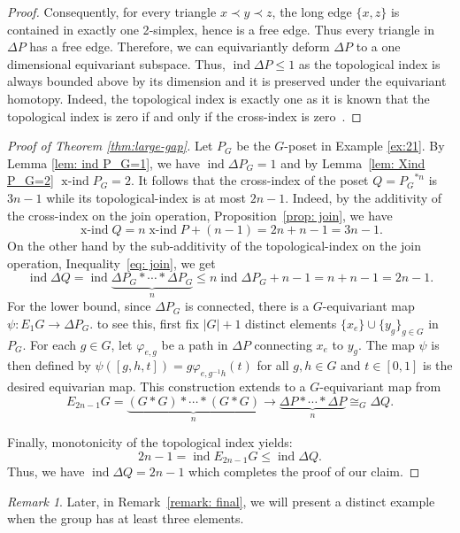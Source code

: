\documentclass[preprint,12pt]{article}
\renewcommand{\le}{\leqslant}
\theoremstyle{definition}
\theoremstyle{remark}
\newtheorem{remark}[theorem]{Remark}
\numberwithin{equation}{section}
\DeclareMathOperator{\ind}{ind}
\DeclareMathOperator{\xind}{x-ind}
\renewcommand{\phi}{\varphi}
\begin{document}
\begin{proof}
Consequently, for every triangle \(x\prec y \prec z\), the long edge \(\{x,z\}\) is contained in exactly one 2‑simplex, hence is a free edge. Thus every triangle in \(\Delta P\) has a free edge. Therefore, we can equivariantly deform $\Delta P$ to a one dimensional equivariant subspace. Thus, $\ind \Delta P\le 1$ as the topological index is always bounded above by its dimension and it is preserved under the equivariant homotopy. Indeed, the topological index is exactly one as it is known that the topological index is zero if and only if the cross-index is zero~\cite[Proposition 1]{bui2023topological}.
\end{proof}


\begin{proof}[Proof of Theorem \ref{thm:large-gap}]
Let $P_G$ be the $G$-poset in Example \ref{ex:21}. By Lemma \ref{lem: ind P_G=1}, we have $\ind \Delta P_G = 1$ and by Lemma~\ref{lem: Xind P_G=2} $\xind P_G=2$. It follows that the cross-index of the poset $Q={P_G}^{\ast n}$ is $3n-1$ while its topological-index is at most $2n-1$. Indeed, by the additivity of the cross-index on the join operation, Proposition~\ref{prop: join}, we have
$$\xind Q= n\xind P+(n-1)=2n+n-1=3n-1.$$
On the other hand by the sub-additivity of the topological-index on the join operation, Inequality~\eqref{eq: join}, we get
$$\ind \Delta Q=\ind \underbrace{\Delta P_G\ast\cdots\ast\Delta P_G}_{n}\le n\ind \Delta P_G+n-1=n+n-1=2n-1.$$
For the lower bound, since $\Delta P_G$ is connected, there is a $G$-equivariant map $\psi \colon E_1G \to \Delta P_G$. to see this, first fix $|G| + 1$ distinct elements $\{x_e\} \cup \{y_g\}_{g \in G}$ in $P_G$. For each $g \in G$, let $\phi_{e,g}$ be a path in $\Delta P$ connecting $x_e$ to $y_g$. The map $\psi$ is then defined by $\psi([g, h, t]) = g\phi_{e,g^{-1}h}(t)$ for all $g,h \in G$ and $t \in [0,1]$ is the desired equivarian map. This construction extends to a $G$-equivariant map from 
$$E_{2n-1}G = \underbrace{(G \ast G)\ast\cdots\ast(G\ast G)}_{n}\to \underbrace{\Delta P\ast\cdots \ast\Delta P}_{n} \cong_{G}\Delta Q.$$

Finally, monotonicity of the topological index yields:
    \[
    2n-1 = \ind E_{2n-1}G \le \ind \Delta Q.
    \]
    Thus, we have $\ind \Delta Q = 2n-1$ which completes the proof of our claim.
\end{proof}

\begin{remark}
    Later, in Remark~\ref{remark: final}, we will present a distinct example when the group has at least three elements.
\end{remark}
\end{document}
